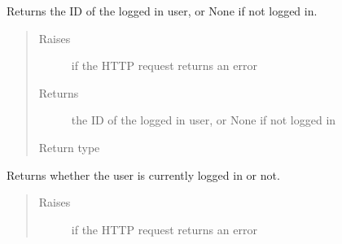 \documentclass[letterpaper,10pt,english]{sphinxmanual}
\begin{document}
\begin{fulllineitems}
\begin{fulllineitems}
\label{\detokenize{autoapi/pine/client/index:pine.client.PineClient.get_my_user_id}}
\sphinxAtStartPar
Returns the ID of the logged in user, or None if not logged in.
\begin{quote}\begin{description}
\item[{Raises}] \leavevmode
\sphinxAtStartPar
{\hyperref[\detokenize{autoapi/pine/client/exceptions/index:pine.client.exceptions.PineClientHttpException}]{}} \textendash{} if the HTTP request returns an error

\item[{Returns}] \leavevmode
\sphinxAtStartPar
the ID of the logged in user, or None if not logged in

\item[{Return type}] \leavevmode
\sphinxAtStartPar
{}

\end{description}\end{quote}

\end{fulllineitems}


\begin{fulllineitems}
\label{\detokenize{autoapi/pine/client/index:pine.client.PineClient.is_logged_in}}
\sphinxAtStartPar
Returns whether the user is currently logged in or not.
\begin{quote}\begin{description}
\item[{Raises}] \leavevmode
\sphinxAtStartPar
{\hyperref[\detokenize{autoapi/pine/client/exceptions/index:pine.client.exceptions.PineClientHttpException}]{}} \textendash{} if the HTTP request returns an error


\end{description}
\end{quote}
\end{fulllineitems}
\end{fulllineitems}
\end{document}
